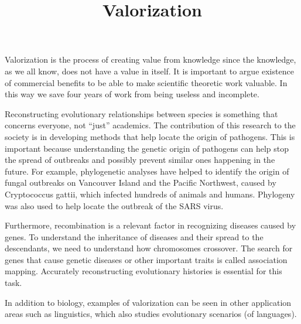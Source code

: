 \documentclass[a4paper,10pt]{article}
\title{Valorization}
\date{}
\begin{document}
\maketitle



Valorization is the process of creating value from knowledge since the knowledge, as we all know, does not have a value in itself. It is important to argue existence of commercial benefits to be able to make scientific theoretic work valuable. In this way we save four years of work from being useless and incomplete. 

Reconstructing evolutionary relationships between species is something that concerns everyone, not ``just'' academics. The contribution of this research to the society is in developing methods that help locate the origin of pathogens. This is important because understanding the genetic origin of pathogens can help stop the spread of outbreaks and possibly prevent similar ones happening in the future. For example, phylogenetic analyses have helped to identify the origin of fungal outbreaks
on Vancouver Island and the Pacific Northwest, caused by Cryptococcus gattii, which
infected hundreds of animals and humans. Phylogeny was also used to help locate the outbreak of the SARS virus. 

Furthermore, recombination is a relevant factor in recognizing diseases caused by genes. To understand the inheritance of diseases and their spread to the descendants, we need to understand how chromosomes crossover. The search for genes that cause genetic diseases or other important traits is called association mapping. Accurately reconstructing evolutionary histories is essential for this task.

In addition to biology, examples of valorization can be seen in other application areas such as linguistics, which also studies evolutionary scenarios (of languages).
\end{document}
